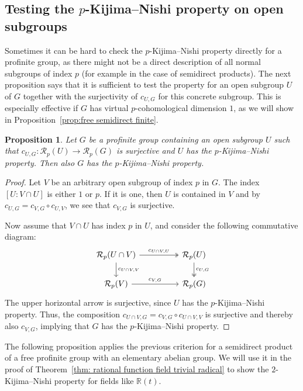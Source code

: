 \documentclass{amsart}
\newtheorem{prop}[thm]{Proposition}
\theoremstyle{definition}
\theoremstyle{remark}
\newcommand{\RR}{\mathbb{R}}
\newcommand{\calR}{\mathcal{R}}
\begin{document}
\subsection{Testing the $p$-Kijima--Nishi property on open subgroups}
Sometimes it can be hard to check the $p$-Kijima--Nishi property directly for a profinite group, as there might not be a direct description of all normal subgroups of index $p$ (for example in the case of semidirect products). The next proposition says that it is sufficient to test the property for an open subgroup $U$ of $G$ together with the surjectivity of $c_{U,G}$ for this concrete subgroup. This is especially effective if $G$ has virtual $p$-cohomological dimension $1$, as we will show in Proposition~\ref{prop:free semidirect finite}.
\begin{prop}
\label{prop:KN property based on subgroup}
    Let $G$ be a profinite group containing an open subgroup $U$ such that $c_{U,G}:\calR_p(U)\to \calR_p(G)$ is surjective and $U$ has the $p$-Kijima--Nishi property. Then also $G$ has the $p$-Kijima--Nishi property. 
\end{prop}
\begin{proof}
    Let $V$ be an arbitrary open subgroup of index $p$ in $G$. The index $[U:V\cap U]$ is either $1$ or $p$. If it is one, then $U$ is contained in $V$ and by $c_{U,G}=c_{V,G}\circ c_{U,V}$, we see that $c_{V,G}$ is surjective. 

    Now assume that $V\cap U$ has index $p$ in $U$, and consider the following commutative diagram:
    \begin{equation*}
        \begin{tikzcd}
            \calR_p(U\cap V)\arrow[rr,"c_{U\cap V,U}",two heads]\arrow[d,"c_{U\cap V,V}"]&&\calR_p(U)\arrow[d,"c_{U,G}",two heads]\\
            \calR_p(V)\arrow[rr,"c_{V,G}"]&&\calR_p(G)
        \end{tikzcd}
    \end{equation*}
    The upper horizontal arrow is surjective, since $U$ has the $p$-Kijima--Nishi property. Thus, the composition $c_{U\cap V,G}=c_{V,G}\circ c_{U\cap V,V}$ is surjective and thereby also $c_{V,G}$, implying that $G$ has the $p$-Kijima--Nishi property.
\end{proof}
The following proposition applies the previous criterion for a semidirect product of a free profinite group with an elementary abelian group. We will use it in the proof of Theorem~\ref{thm: rational function field trivial radical} to show the $2$-Kijima--Nishi property for fields like $\RR(t)$.
\end{document}
